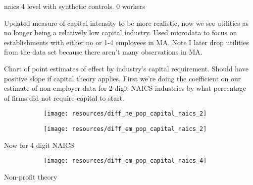 \documentclass[12pt]{article}
\begin{document}
\pagebreak

naics 4 level with synthetic controls. 0 workers

\pagebreak

\pagebreak

Updated measure of capital intensity to be more realistic, now we see utilities as no longer being a relatively low capital industry. Used microdata to focus on establishments with either no or 1-4 employees in MA. Note I later drop utilities from the data set because there aren't many observations in MA. 



\pagebreak

Chart of point estimates of effect by industry's capital requirement. Should have positive slope if capital theory applies. First we're doing the coefficient on our estimate of non-employer data for 2 digit NAICS industries by what percentage of firms did not require capital to start. 

\begin{figure}[H]
	\centering
	\begin{subfigure}[b]{0.4\textwidth}
	    \texttt{[image: resources/diff\_ne\_pop\_capital\_naics\_2]}
	\end{subfigure}
	\begin{subfigure}[b]{0.4\textwidth}
	    \texttt{[image: resources/diff\_em\_pop\_capital\_naics\_2]}
	\end{subfigure}
\end{figure}

Now for 4 digit NAICS

\begin{figure}[H]
	\centering
	\begin{subfigure}[b]{0.4\textwidth}
	    \texttt{[image: resources/diff\_em\_pop\_capital\_naics\_4]}
	\end{subfigure}
\end{figure}

\pagebreak

Non-profit theory

\pagebreak

\begin{comment}

Triple diff of industry state measurements

\pagebreak

Next steps: can possibly look at PUMS individual (ACS) data on employment to see if industries with that were greatly affected by health care had more employment

\end{comment}
\end{document}
